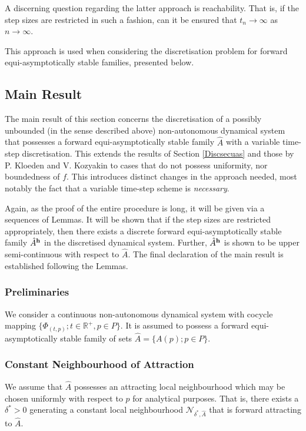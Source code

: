A discerning question regarding the latter approach is
reachability. That is, if the step sizes are restricted in such a
fashion, can it be ensured that $t_n \to \infty$ as $n \to
\infty$.

This approach is used when considering the discretisation problem
for forward equi-asymptotically stable families, presented below.

\subsection{Main Result}

The main result of this section concerns the discretisation of a
possibly unbounded (in the sense described above) non-autonomous
dynamical system that possesses a forward equi-asymptotically
stable family $\hat{A}$ with a variable time-step discretisation.
This extends the results of Section \ref{Discsecuas} and those by P.
Kloeden and V. Kozyakin \cite{KlKo01} to cases that do not possess uniformity,
nor boundedness of $f$. This introduces distinct changes in the approach needed,
most notably the fact that a variable time-step scheme is \textit{necessary}.

Again, as the proof of the entire procedure is long, it will be given via
a sequences of Lemmas. It will be shown that if the step sizes are
restricted appropriately, then there exists a discrete forward
equi-asymptotically stable family $\hat{A}^{\bf h}$ in the discretised dynamical
system. Further, $\hat{A}^{\bf h}$ is shown to be upper semi-continuous with respect
to $\hat{A}$.  The final declaration of the main result is established following
the Lemmas.

\subsubsection{Preliminaries}

We consider a continuous non-autonomous dynamical system with
cocycle mapping $\{ \Phi_{(t,p)}; t \in \mathbb{R}^+, p \in P \}$.
It is assumed to possess a forward equi-asymptotically stable
family of sets $\hat{A} = \{ A(p); p \in P \}$.

\subsubsection{Constant Neighbourhood of Attraction}

We assume that $\hat{A}$ possesses an attracting local
neighbourhood which may be chosen uniformly with respect to $p$ for analytical
purposes. That is, there exists a $\delta^* > 0$ generating a
constant local neighbourhood $\mathcal{N}_{\delta^*, \hat{A}}$
that is forward attracting to $\hat{A}$.


